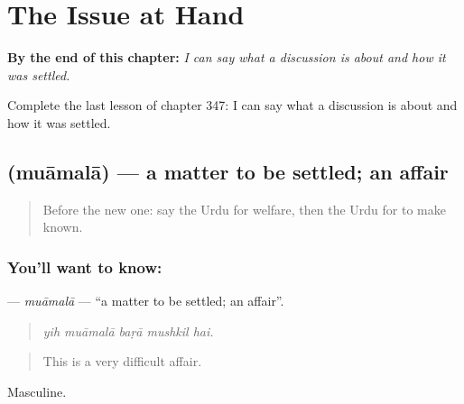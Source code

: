 
\chapter{The Issue at Hand}
\label{ch:ur-the-issue-at-hand}

\begin{chapteropening}
\textbf{By the end of this chapter:} \emph{I can say what a discussion is about and how it was settled.}

Complete the last lesson of chapter 347: I can say what a discussion is about and how it was settled.
\end{chapteropening}

\section[\texorpdfstring{\ur{معاملہ} (muāmalā)}{معاملہ (muāmalā)}]{ (muāmalā) — a matter to be settled; an affair}

\label{lesson:UR-C347-muamala}



\begin{quote}
Before the new one: say the Urdu for welfare, then the Urdu for to make known.
\end{quote}

\subsection*{You'll want to know: }
\textbf{} — \emph{muāmalā} — \textquotedblleft{}a matter to be settled; an affair\textquotedblright{}.

\begin{quote}
    
\end{quote}

\begin{quote}
\emph{yih muāmalā baṛā mushkil hai.}
\end{quote}

\begin{quote}
This is a very difficult affair.
\end{quote}

Masculine.

